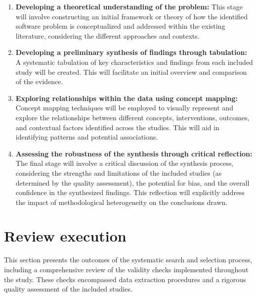 \begin{enumerate}
     \item \textbf{Developing a theoretical understanding of the problem:} This
	     stage will involve constructing an initial framework or theory of
		 how the identified software problem is conceptualized and
		 addressed within the existing literature, considering the
		 different approaches and contexts. 
     \item \textbf{Developing a preliminary synthesis of findings through
	     tabulation:} A systematic tabulation of key characteristics and
		 findings from each included study will be created. This will
		 facilitate an initial overview and comparison of the evidence.
     \item \textbf{Exploring relationships within the data using concept
	     mapping:} Concept mapping techniques will be employed to visually
		 represent and explore the relationships between different
		 concepts, interventions, outcomes, and contextual factors
		 identified across the studies. This will aid in identifying
		 patterns and potential associations. 
     \item \textbf{Assessing the robustness of the synthesis through critical
	     reflection:} The final stage will involve a critical discussion of
		 the synthesis process, considering the strengths and
		 limitations of the included studies (as determined by the
		 quality assessment), the potential for bias, and the overall
		 confidence in the synthesized findings. This reflection will
		 explicitly address the impact of methodological heterogeneity
		 on the conclusions drawn.
 \end{enumerate}




\section{Review execution}
\label{sec:Review_execution}



This section presents the outcomes of the systematic search and selection
process, including a comprehensive review of the validity checks implemented
throughout the study.
%
These checks encompassed data extraction procedures and a rigorous quality
assessment of the included studies.



